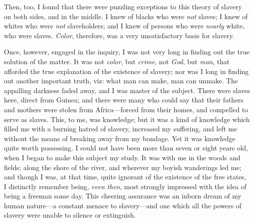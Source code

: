 Then, too, I found that there were puzzling exceptions to this theory of
slavery on both sides, and in the middle. I knew of blacks who were
\emph{not} slaves; I knew of whites who were \emph{not} slaveholders;
and I knew of persons who were \emph{nearly} white, who were slaves.
\emph{Color}, therefore, was a very unsatisfactory basis for slavery.

Once, however, engaged in the inquiry, I was not very long in finding
out the true solution of the matter. It was not \emph{color}, but
\emph{crime}, not \emph{God}, but \emph{man}, that afforded the true
explanation of the existence of slavery; nor was I long in finding out
another important truth, viz: what man can make, man can unmake. The
appalling darkness faded away, and I was master of the subject. There
were slaves here, {\protect\hypertarget{91}{}{}}direct from Guinea; and
there were many who could say that their fathers and mothers were stolen
from Africa---forced from their homes, and compelled to serve as slaves.
This, to me, was knowledge; but it was a kind of knowledge which filled
me with a burning hatred of slavery, increased my suffering, and left me
without the means of breaking away from my bondage. Yet it was knowledge
quite worth possessing. I could not have been more than seven or eight
years old, when I began to make this subject my study. It was with me in
the woods and fields; along the shore of the river, and wherever my
boyish wanderings led me; and though I was, at that time, quite ignorant
of the existence of the free states, I distinctly remember being,
\emph{even then}, most strongly impressed with the idea of being a
freeman some day. This cheering assurance was an inborn dream of my
human nature---a constant menace to slavery---and one which all the
powers of slavery were unable to silence or extinguish.

